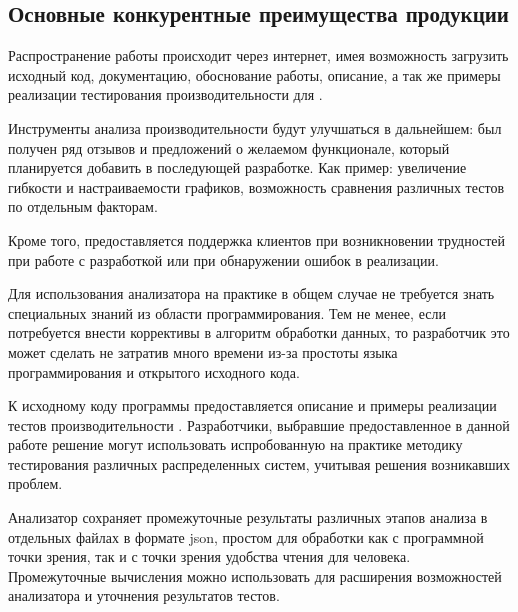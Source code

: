 \subsection{Основные конкурентные преимущества продукции}
	\begin{description}[noitemsep]
		\item[Способ распространения.]
			Распространение работы происходит через интернет, имея возможность загрузить исходный код, документацию, обоснование работы, описание, а так же примеры реализации тестирования производительности для \marm{}. 
			
		\item[Дальнейшее сопросвождение ПО и поддержка клиентов.]
			Инструменты анализа производительности будут улучшаться в дальнейшем: был получен ряд отзывов и предложений о  желаемом функционале, который планируется добавить в последующей разработке. Как пример: увеличение гибкости и настраиваемости графиков, возможность сравнения различных тестов по отдельным факторам.
			
			Кроме того, предоставляется поддержка клиентов при возникновении трудностей при работе с разработкой или при обнаружении ошибок в реализации.
			
		\item[Простота использования.]
			Для использования анализатора на практике в общем случае не требуется знать специальных знаний из области программирования. Тем не менее, если потребуется внести коррективы в алгоритм обработки данных, то разработчик это может сделать не затратив много времени из-за простоты языка программирования и открытого исходного кода.
		
		\item[Предоставление методики проведения тестирования производительности.]
			К исходному коду программы предоставляется описание и примеры реализации тестов производительности \marm{}. Разработчики, выбравшие предоставленное в данной работе решение могут использовать испробованную на практике методику тестирования различных распределенных систем, учитывая решения возникавших проблем.
			
		\item[Использование промежуточных файлов вычислений в формате json]
			Анализатор сохраняет промежуточные результаты различных этапов анализа в отдельных файлах в формате json, простом для обработки как с программной точки зрения, так и с точки зрения удобства чтения для человека. Промежуточные вычисления можно использовать для расширения возможностей анализатора и уточнения результатов тестов.
	\end{description}

